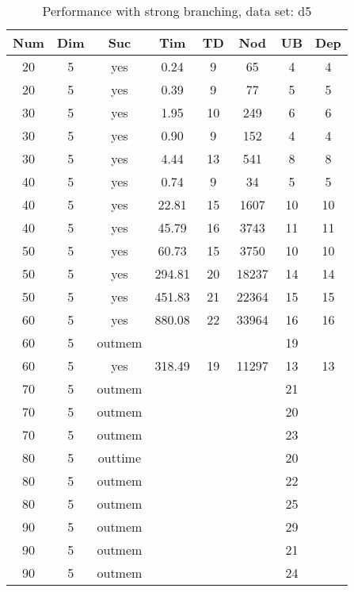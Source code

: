 \begin{table}[!htb]
  \centering
  \begin{tabular}[center]{|c|c|c|c|c|c|c|c|}
    \hline
    Num & Dim & Suc & Tim & TD & Nod & UB & Dep \\
    \hline
    20 & 5 & yes & 0.24 & 9 & 65 & 4 & 4 \\
    20 & 5 & yes & 0.39 & 9 & 77 & 5 & 5 \\
    30 & 5 & yes & 1.95 & 10 & 249 & 6 & 6 \\
    30 & 5 & yes & 0.90 & 9 & 152 & 4 & 4 \\
    30 & 5 & yes & 4.44 & 13 & 541 & 8 & 8 \\
    40 & 5 & yes & 0.74 & 9 & 34 & 5 & 5 \\
    40 & 5 & yes & 22.81 & 15 & 1607 & 10 & 10 \\
    40 & 5 & yes & 45.79 & 16 & 3743 & 11 & 11 \\
    50 & 5 & yes & 60.73 & 15 & 3750 & 10 & 10 \\
    50 & 5 & yes & 294.81 & 20 & 18237 & 14 & 14 \\
    50 & 5 & yes & 451.83 & 21 & 22364 & 15 & 15 \\
    60 & 5 & yes & 880.08 & 22 & 33964 & 16 & 16 \\
    60 & 5 & outmem &&&& 19 &\\
    60 & 5 & yes & 318.49 & 19 & 11297 & 13 & 13 \\
    70 & 5 & outmem &&&& 21 &\\
    70 & 5 & outmem &&&& 20 &\\
    70 & 5 & outmem &&&& 23 &\\
    80 & 5 & outtime &&&& 20 &\\
    80 & 5 & outmem &&&& 22 &\\
    80 & 5 & outmem &&&& 25 &\\
    90 & 5 & outmem &&&& 29 &\\
    90 & 5 & outmem &&&& 21 &\\
    90 & 5 & outmem &&&& 24 &\\
    \hline
  \end{tabular}
  \caption{Performance with strong branching, data set: d5}
  \label{tab:test.bran-d5}
\end{table}

